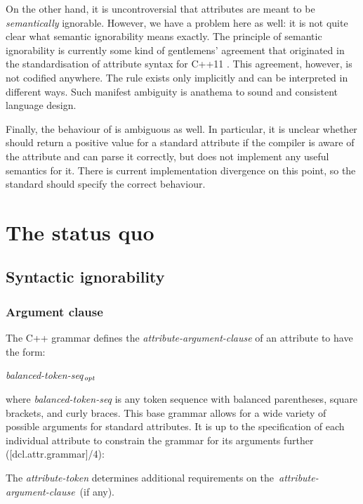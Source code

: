 On the other hand, it is uncontroversial that attributes are meant to be \emph{semantically} ignorable. However, we have a problem here as well: it is not quite clear what semantic ignorability means exactly. The principle of semantic ignorability is currently some kind of gentlemens' agreement that originated in the standardisation of attribute syntax for C++11 \cite{N2761}. This agreement, however, is not codified anywhere. The rule exists only implicitly and can be interpreted in different ways. Such manifest ambiguity is anathema to sound and consistent language design.

Finally, the behaviour of  is ambiguous as well. In particular, it is unclear whether \mbox{} should return a positive value for a standard attribute if the compiler is aware of the attribute and can parse it correctly, but does not implement any useful semantics for it. There is current implementation divergence on this point, so the standard should specify the correct behaviour.

\section{The status quo}

\subsection{Syntactic ignorability}
\label{subsec:syntax}
\subsubsection{Argument clause}
\label{subsubsec:args}

The C++ grammar defines the \emph{attribute-argument-clause} of an attribute to have the form:
\begin{adjustwidth}{0.5cm}{0.5cm}
\tcode{( }\emph{balanced-token-seq}$_\emph{opt}$\tcode{ )}
\end{adjustwidth}
where \emph{balanced-token-seq} is any token sequence with balanced parentheses, square brackets, and curly braces. This base grammar allows for a wide variety of possible arguments for standard attributes. It is up to the specification of each individual attribute to constrain the grammar for its arguments further ([dcl.attr.grammar]/4):

\begin{adjustwidth}{0.5cm}{0.5cm}
[...] The \emph{attribute-token} determines additional requirements on the \emph{attribute-argument-clause} (if any).
\end{adjustwidth}

